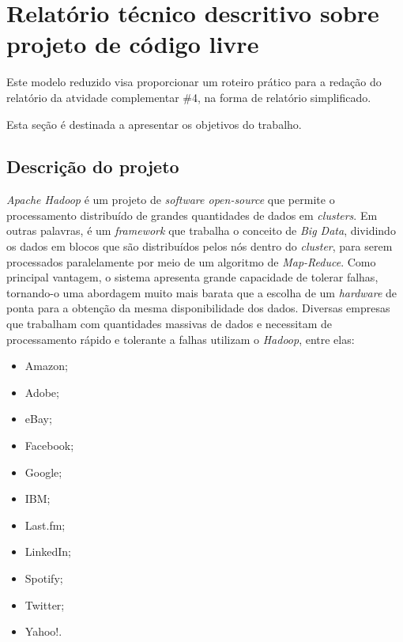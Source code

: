 \documentclass[12pt,a4paper]{article} %
\newcommand\BackgroundStructure{ %
\setlength{\unitlength}{1mm} %

\setlength\fboxsep{0mm} %
\setlength\fboxrule{0.5mm} %
\put(10, 20pr){\fcolorbox{black}{gray!5}{\framebox(155,247){}}} %
\put(165, 20){\fcolorbox{black}{gray!10}{\framebox(37,247){}}} %
\put(10, 262){\fcolorbox{black}{white!10}{\framebox(192, 25){}}} %
\put(175, 263){\texttt{[image: ]}} %
}
\begin{document}


\section{Relatório técnico descritivo sobre projeto de código livre} 

Este modelo reduzido visa proporcionar um roteiro prático para a redação do relatório da atvidade complementar \#4, na forma de relatório simplificado. 

Esta seção é destinada a apresentar os objetivos do trabalho.\\

\subsection{Descrição do projeto}

\emph{Apache Hadoop} é um projeto de \emph{software open-source} que permite o processamento distribuído de grandes quantidades de dados em \emph{clusters}. Em outras palavras, é um \emph{framework} que trabalha o conceito de \emph{Big Data}, dividindo os dados em blocos que são distribuídos pelos nós dentro do \emph{cluster}, para serem processados paralelamente por meio de um algoritmo de \emph{Map-Reduce}. Como principal vantagem, o sistema apresenta grande capacidade de tolerar falhas, tornando-o uma abordagem muito mais barata que a escolha de um \emph{hardware} de ponta para a obtenção da mesma disponibilidade dos dados. Diversas empresas que trabalham com quantidades massivas de dados e necessitam de processamento rápido e tolerante a falhas utilizam o \emph{Hadoop}, entre elas:

\begin{itemize}
\item Amazon;
\item Adobe;
\item eBay;
\item Facebook;
\item Google;
\item IBM;
\item Last.fm;
\item LinkedIn;
\item Spotify;
\item Twitter;
\item Yahoo!.
\end{itemize}
\end{document}
